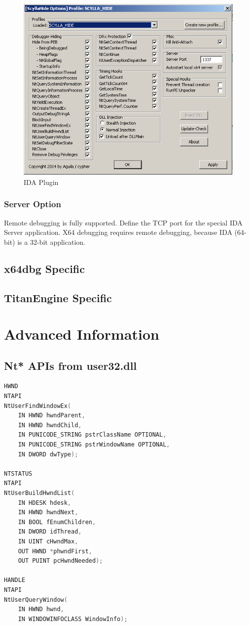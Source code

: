 \documentclass[10pt,a4paper]{article}
\begin{document}
\begin{figure}[H]
\centering
\includegraphics[scale=1]{idaplugin.PNG}
\caption{IDA Plugin}
\end{figure}

\subsubsection{Server Option}
Remote debugging is fully supported. Define the TCP port for the special IDA Server application. X64 debugging requires remote debugging, because IDA (64-bit) is a 32-bit application.

\subsection{x64dbg Specific}
\subsection{TitanEngine Specific}
\section{Advanced Information}
\subsection{Nt* APIs from user32.dll}

\begin{lstlisting}[language=C, caption=Special Nt* APIs declaration]
HWND
NTAPI
NtUserFindWindowEx(
    IN HWND hwndParent,
    IN HWND hwndChild,
    IN PUNICODE_STRING pstrClassName OPTIONAL,
    IN PUNICODE_STRING pstrWindowName OPTIONAL,
    IN DWORD dwType);

NTSTATUS
NTAPI
NtUserBuildHwndList(
    IN HDESK hdesk,
    IN HWND hwndNext,
    IN BOOL fEnumChildren,
    IN DWORD idThread,
    IN UINT cHwndMax,
    OUT HWND *phwndFirst,
    OUT PUINT pcHwndNeeded);

HANDLE
NTAPI
NtUserQueryWindow(
    IN HWND hwnd,
    IN WINDOWINFOCLASS WindowInfo);
\end{lstlisting}
\end{document}
